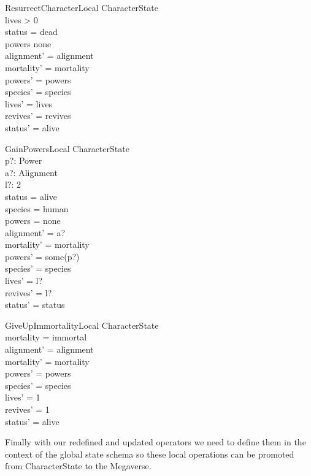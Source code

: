\documentclass{article}
\begin{document}
\begin{schema}{ResurrectCharacterLocal}
\Delta CharacterState \\
\where
lives > 0 \\
status = dead \\
powers \neq none \\ 
alignment' = alignment \\
mortality' = mortality \\
powers' = powers \\ 
species' = species \\
lives' = lives \\
revives' = revives \\
status' = alive \\
\end{schema}

\begin{schema}{GainPowersLocal}
\Delta CharacterState \\
p?: Power \\
a?: Alignment \\
l?: 2  \\
\where
status = alive \\ 
species = human \\
powers = none \\
alignment' = a? \\
mortality' = mortality \\
powers' = some(p?) \\ 
species' = species \\
lives' = l? \\
revives' = l? \\
status' = status \\
\end{schema}

\begin{schema}{GiveUpImmortalityLocal}
\Delta CharacterState \\
\where
mortality = immortal \\
alignment' = alignment \\
mortality' = mortality \\
powers' = powers \\ 
species' = species \\
lives' = 1 \\
revives' = 1 \\
status' = alive \\
\end{schema}

\hspace{-0.64cm} Finally with our redefined and updated operators we need to define them in the context of the global state schema so these local operations can be promoted from CharacterState to the Megaverse. 
\end{document}
